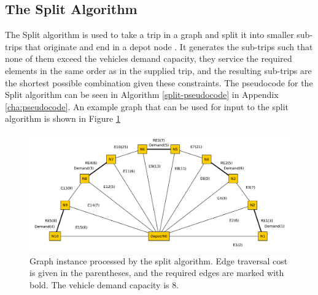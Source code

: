 
\subsection{The Split Algorithm} %
\label{sub:the_split_algorithm}

The Split algorithm is used to take a trip in a graph and split it into smaller sub-trips that originate and end in a depot node \citep{ulusoy1985CARP}. It generates the sub-trips such that none of them exceed the vehicles demand capacity, they service the required elements in the same order as in the supplied trip, and the resulting sub-trips are the shortest possible combination given these constraints. The pseudocode for the Split algorithm can be seen in Algorithm \ref{split-pseudocode} in Appendix \ref{cha:pseudocode}. An example graph that can be used for input to the split algorithm is shown in Figure \ref{fig:sgwspp}

\begin{figure}[thbp]
    \centerline{\includegraphics[width=\textwidth]{figures/SplitIllustrations/Split_GraphWithShortestPathsPlain.pdf}}
    \caption{Graph instance processed by the split algorithm. Edge traversal cost is given in the parentheses, and the required edges are marked with bold. The vehicle demand capacity is 8.}
    \label{fig:sgwspp}
\end{figure}


